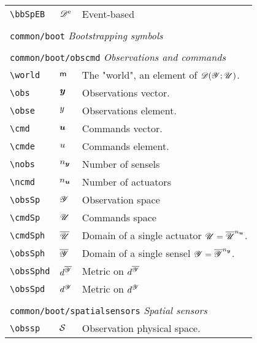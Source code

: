 \begin{longtable}{lll}
 {\color[rgb]{0.5,0.5,0.5}\texttt{\textbackslash bbSpEB}} & $\mathscr{D}^{\text{e}}$ &  Event-based\\ 
  &  & \\ 
 \multicolumn{3}{l}{{\color[rgb]{0.5,0.5,0.5}\texttt{common/boot}} \emph{Bootstrapping symbols}}\\ 
 \hline
 &  & \\ 
 \multicolumn{3}{l}{{\color[rgb]{0.5,0.5,0.5}\texttt{common/boot/obscmd}} \emph{Observations and commands}}\\ 
 \hline
{\color[rgb]{0.5,0.5,0.5}\texttt{\textbackslash world}} & $\textsf{m}$ &  The "world", an element of $\mathscr{D}(\mathscr{Y};\mathscr{U})$.\\ 
 {\color[rgb]{0.5,0.5,0.5}\texttt{\textbackslash obs}} & $\boldsymbol{y}$ &  Observations vector.\\ 
 {\color[rgb]{0.5,0.5,0.5}\texttt{\textbackslash obse}} & $y$ &  Observations element.\\ 
 {\color[rgb]{0.5,0.5,0.5}\texttt{\textbackslash cmd}} & $\boldsymbol{u}$ &  Commands vector.\\ 
 {\color[rgb]{0.5,0.5,0.5}\texttt{\textbackslash cmde}} & $u$ &  Commands element.\\ 
 {\color[rgb]{0.5,0.5,0.5}\texttt{\textbackslash nobs}} & ${n_{\boldsymbol{y}}}$ &  Number of sensels\\ 
 {\color[rgb]{0.5,0.5,0.5}\texttt{\textbackslash ncmd}} & ${n_{\boldsymbol{u}}}$ &  Number of actuators\\ 
 {\color[rgb]{0.5,0.5,0.5}\texttt{\textbackslash obsSp}} & $\mathscr{Y}$ &  Observation space \\ 
 {\color[rgb]{0.5,0.5,0.5}\texttt{\textbackslash cmdSp}} & $\mathscr{U}$ &  Commands space\\ 
 {\color[rgb]{0.5,0.5,0.5}\texttt{\textbackslash cmdSph}} & $\overline{\mathscr{U}}$ &  Domain of a single actuator $\mathscr{U}=\overline{\mathscr{U}}^{n_{\boldsymbol{u}}}$.\\ 
 {\color[rgb]{0.5,0.5,0.5}\texttt{\textbackslash obsSph}} & $\overline{\mathscr{Y}}$ &  Domain of a single sensel $\mathscr{Y}=\overline{\mathscr{Y}}^{n_{\boldsymbol{y}}}$.\\ 
 {\color[rgb]{0.5,0.5,0.5}\texttt{\textbackslash obsSphd}} & $d^{\overline{\mathscr{Y}}}$ &  Metric on $d^{\overline{\mathscr{Y}}}$\\ 
 {\color[rgb]{0.5,0.5,0.5}\texttt{\textbackslash obsSpd}} & $d^{\mathscr{Y}}$ &  Metric on $d^{\mathscr{Y}}$\\ 
  &  & \\ 
 \multicolumn{3}{l}{{\color[rgb]{0.5,0.5,0.5}\texttt{common/boot/spatialsensors}} \emph{Spatial sensors}}\\ 
 \hline
{\color[rgb]{0.5,0.5,0.5}\texttt{\textbackslash obssp}} & $\obssp$ &  Observation physical space.\\ 

\end{longtable}
